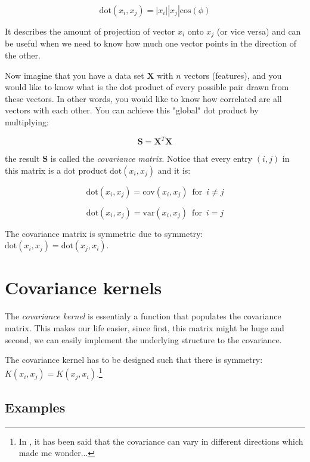 \documentclass[10pt,twocolumn]{article}
\begin{document}
\begin{equation}
\text{dot}(x_i, x_j) = |x_i| |x_j| \text{cos}(\phi)
\end{equation}

It describes the amount of projection of vector $x_i$ onto $x_j$ (or vice versa) and can be useful when we need to know how much one vector points in the direction of the other. 

Now imagine that you have a data set $\mathbf{X}$ with $n$ vectors (features), and you would like to know what is the dot product of every possible pair drawn from these vectors. In other words, you would like to know how correlated are all vectors with each other. You can achieve this "global" dot product by multiplying:

\begin{equation}
\mathbf{S} = \mathbf{X}^T \mathbf{X} 
\end{equation}

the result $\mathbf{S}$ is called the \textit{covariance matrix}. Notice that every entry $(i,j)$ in this matrix is a dot product $\text{dot}(x_i, x_j)$ and it is:

\begin{equation}
\text{dot}(x_i, x_j) = \text{cov}(x_i, x_j) \,\,\, \text{for} \,\,\, i \neq j
\end{equation}

\begin{equation}
\text{dot}(x_i, x_j) = \text{var}(x_i, x_j) \,\,\, \text{for} \,\,\, i = j
\end{equation}

The covariance matrix is symmetric due to symmetry: $\text{dot}(x_i, x_j) = \text{dot}(x_j, x_i)$.

\section{Covariance kernels}

The \textit{covariance kernel} is essentialy a function that populates the covariance matrix. This makes our life easier, since first, this matrix might be huge and second, we can easily implement the underlying structure to the covariance.

The covariance kernel has to be designed such that there is symmetry: $K(x_i, x_j) = K(x_j, x_i)$.\footnote{In \cite{Scaife}, it has been said that the covariance can vary in different directions which made me wonder...}

\subsection{Examples}
\end{document}
